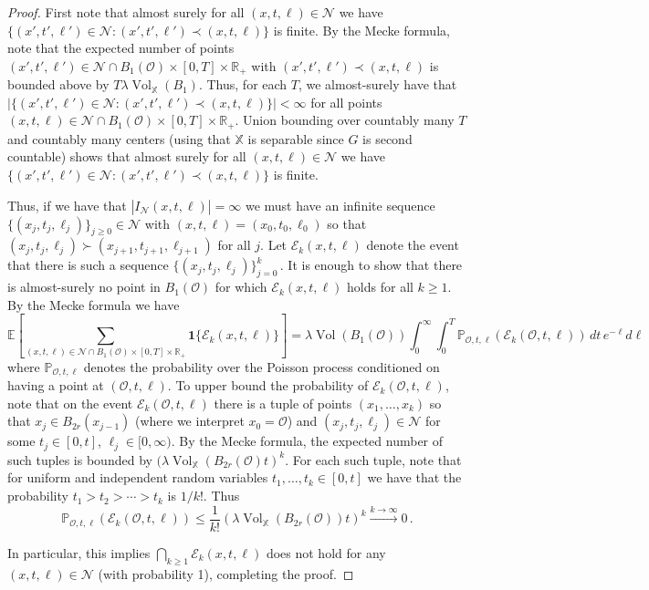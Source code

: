 \documentclass[11pt]{amsart}
\theoremstyle{definition}
\theoremstyle{remark}
\newcommand{\EE}{\mathbb{E}}
\newcommand{\R}{\mathbb{R}}
\newcommand{\bX}{\mathbb{X}}
\newcommand{\cO}{\mathcal{O}}
\newcommand{\Vol}{\operatorname{Vol}}
\newcommand{\one}{\mathbf{1}}
\begin{document}
\begin{proof}
	First note that almost surely for all $(x,t,\ell) \in \mathcal{N}$ we have $\{(x',t',\ell') \in \mathcal{N} : (x',t',\ell') \prec (x,t,\ell) \}$ is finite.  By the Mecke formula, note that the expected number of points $(x',t',\ell') \in \mathcal{N} \cap B_1(\cO) \times [0,T] \times \R_+$ with $(x',t',\ell') \prec (x,t,\ell)$ is bounded above by $T \lambda \Vol_\bX(B_1)$.  Thus, for each $T$, we almost-surely have that $|\{(x',t',\ell') \in \mathcal{N} : (x',t',\ell') \prec (x,t,\ell) \}| < \infty$ for all points $(x,t,\ell) \in \mathcal{N} \cap B_1(\cO) \times [0,T] \times \R_+$.  Union bounding over countably many $T$ and countably many centers (using that $\bX$ is separable since $G$ is second countable) shows that almost surely for all $(x,t,\ell) \in \mathcal{N}$ we have $\{(x',t',\ell') \in \mathcal{N} : (x',t',\ell') \prec (x,t,\ell) \}$ is finite.
	
	Thus, if we have that $|I_{\mathcal{N}}(x,t,\ell)| = \infty$ we must have an infinite sequence $ \{(x_j,t_j,\ell_j)\}_{j \geq 0} \in \mathcal{N}$ with $(x,t,\ell) = (x_0,t_0,\ell_0)$  so that $(x_j,t_j,\ell_j) \succ (x_{j+1},t_{j+1},\ell_{j+1})$ for all $j$.  Let $\mathcal{E}_k(x,t,\ell)$ denote the event that there is such a sequence $\{(x_j,t_j,\ell_j)\}_{j  = 0}^k\,.$  It is enough to show that there is almost-surely no point in $B_1(\cO)$ for which $\mathcal{E}_k(x,t,\ell)$ holds for all $k \geq 1$. By the Mecke formula \cite[Theorem 4.4]{last2017lectures} we have  $$\EE\left[  \sum_{(x,t,\ell) \in \mathcal{N} \cap B_1(\cO) \times [0,T] \times \R_+} \one\{\mathcal{E}_k(x,t,\ell)\}  \right] = \lambda \Vol(B_1(\cO)) \int_0^\infty \int_0^T \mathbb{P}_{\cO,t,\ell}(\mathcal{E}_k(\cO,t,\ell)) \,dt \, e^{-\ell} d\ell$$
	where $\mathbb{P}_{\cO,t,\ell}$ denotes the probability over the Poisson process conditioned on having a point at $(\cO,t,\ell)$.  
	To upper bound the probability of $\mathcal{E}_k(\cO,t,\ell)$, note that on the event $\mathcal{E}_k(\cO,t,\ell)$ there is a tuple of points $(x_1,\ldots,x_k)$ so that $x_j \in B_{2r}(x_{j-1})$ (where we interpret $x_0 = \cO$) and $(x_j,t_j,\ell_j) \in \mathcal{N}$ for some $t_j \in [0,t]$, $\ell_j\in [0,\infty)$.  By the Mecke formula, the expected number of such tuples is bounded by $(\lambda \Vol_{\bX}(B_{2r}(\cO)t)^k$.  For each such tuple, note that for uniform and independent random variables $t_1,\ldots,t_k \in [0,t]$ we have that the probability $t_1 > t_2 > \cdots  > t_k$ is $1/k!.$  Thus
	\begin{equation*}
		\mathbb{P}_{\cO,t,\ell}(\mathcal{E}_k(\cO,t,\ell)) \leq \frac{1}{k!}(\lambda \Vol_\bX(B_{2r}(\cO))t)^k \xrightarrow{k \to \infty} 0 \,.
	\end{equation*}
	
	
	
	
	In particular, this implies $\bigcap_{k \geq 1} \mathcal{E}_k(x,t,\ell)$ does not hold for any $(x,t,\ell) \in \mathcal{N}$ (with probability 1), completing the proof.
\end{proof}
\end{document}
